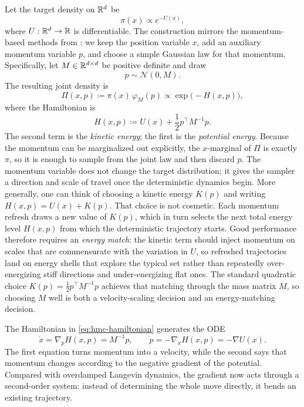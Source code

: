 Let the target density on $\mathbb{R}^d$ be
\[
  \pi(x) \propto e^{-U(x)},
\]
where $U:\mathbb{R}^d\to\mathbb{R}$ is differentiable.
The construction mirrors the momentum-based methods from : we keep the position variable $x$, add an auxiliary momentum variable $p$, and choose a simple Gaussian law for that momentum.
Specifically, let $M\in\mathbb{R}^{d\times d}$ be positive definite and draw
\[
  p \sim \mathcal{N}(0,M).
\]
The resulting joint density is
\begin{equation}
  \Pi(x,p)
  \coloneqq
  \pi(x)\,\varphi_M(p)
  \propto
  \exp\!\bigl(-H(x,p)\bigr),
  \label{eq:hmc-joint}
\end{equation}
where the Hamiltonian is
\begin{equation}
  H(x,p)
  \coloneqq
  U(x) + \frac{1}{2}p^\top M^{-1}p.
  \label{eq:hmc-hamiltonian}
\end{equation}
The second term is the \emph{kinetic energy}; the first is the \emph{potential energy}.
Because the momentum can be marginalized out explicitly, the $x$-marginal of $\Pi$ is exactly $\pi$, so it is enough to sample from the joint law and then discard $p$.
The momentum variable does not change the target distribution; it gives the sampler a direction and scale of travel once the deterministic dynamics begin.
More generally, one can think of choosing a kinetic energy \(K(p)\) and writing \(H(x,p)=U(x)+K(p)\).
That choice is not cosmetic.
Each momentum refresh draws a new value of \(K(p)\), which in turn selects the next total energy level \(H(x,p)\) from which the deterministic trajectory starts.
Good performance therefore requires an \emph{energy match}: the kinetic term should inject momentum on scales that are commensurate with the variation in \(U\), so refreshed trajectories land on energy shells that explore the typical set rather than repeatedly over-energizing stiff directions and under-energizing flat ones.
The standard quadratic choice \(K(p)=\frac12 p^\top M^{-1}p\) achieves that matching through the mass matrix \(M\), so choosing \(M\) well is both a velocity-scaling decision and an energy-matching decision.

The Hamiltonian in \eqref{eq:hmc-hamiltonian} generates the ODE
\begin{equation}
  \dot x = \nabla_p H(x,p) = M^{-1}p,
  \qquad
  \dot p = -\nabla_x H(x,p) = -\nabla U(x).
  \label{eq:hmc-hamilton-equations}
\end{equation}
The first equation turns momentum into a velocity, while the second says that momentum changes according to the negative gradient of the potential.
Compared with overdamped Langevin dynamics, the gradient now acts through a second-order system: instead of determining the whole move directly, it bends an existing trajectory.

